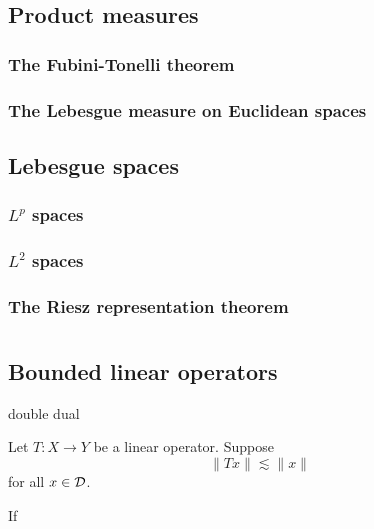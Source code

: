 \documentclass{../note}
\begin{document}
\chapter{Product measures}
\section{The Fubini-Tonelli theorem}
\section{The Lebesgue measure on Euclidean spaces}

\chapter{Lebesgue spaces}
\section{$L^p$ spaces}
\section{$L^2$ spaces}
\section{The Riesz representation theorem}



\part{}

\chapter{}





\chapter{Bounded linear operators}


\begin{prb}
double dual

\end{prb}

\begin{prb}
Let $T:X\to Y$ be a linear operator.
Suppose
\[\|Tx\|\lesssim\|x\|\]
for all $x\in\mathcal{D}$.
\begin{parts}
\item If 
\end{parts}
\end{prb}
\end{document}
